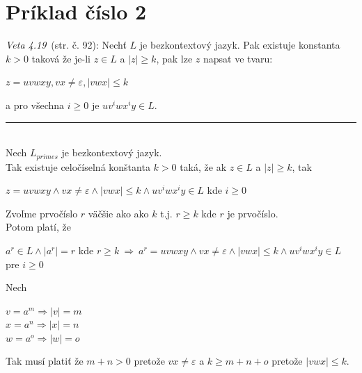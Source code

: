 \documentclass[11pt,a4paper]{article}
\begin{document}
\newpage
\section{Príklad číslo 2} %

\textit{Veta 4.19}~\cite{TIN}(str. č. 92): Nechť $L$ je bezkontextový jazyk. Pak existuje konstanta $k>0$ taková že je-li $z \in L$ a $|z| \geq k$, pak lze $z$ napsat ve tvaru:

\begin{center}
$z = uvwxy, vx \neq \varepsilon, |vwx| \leq k$
\end{center}

a pro všechna $i \geq 0$ je $uv^{i}wx^{i}y \in L$.

\rule{17cm}{0.4pt}

\hfill\\[-2em]

Nech $L_{primes}$ je bezkontextový jazyk.\\

Tak existuje celočíselná konštanta $k > 0$ taká, že ak $z \in L$ a $|z| \geq k$, tak

\begin{center}
$z = uvwxy \wedge vx \neq \varepsilon \wedge |vwx| \leq k \wedge uv^{i}wx^{i}y \in L$ kde $i \geq 0$\\
\end{center}

Zvoľme prvočíslo $r$ väčšie ako ako $k$ t.j. $r \geq k$ kde $r$ je prvočíslo.\\

Potom platí, že

\begin{center}
$a^{r} \in L \wedge |a^{r}| = r$ kde $r \geq k \ \Longrightarrow \ a^{r} = uvwxy \wedge vx \neq \varepsilon \wedge |vwx| \leq k \wedge uv^{i}wx^{i}y \in L$ pre $i \geq 0$\\
\end{center}

Nech
\begin{center}
$v = a^{m} \Rightarrow |v| = m$\\
$x = a^{n} \Rightarrow |x| = n$\\
$w = a^{o} \Rightarrow |w| = o$\\
\end{center}

Tak musí platiť že $m+n > 0$ pretože $vx \neq \varepsilon$ a $k \geq m+n+o$ pretože $|vwx| \leq k$.\\
\end{document}
